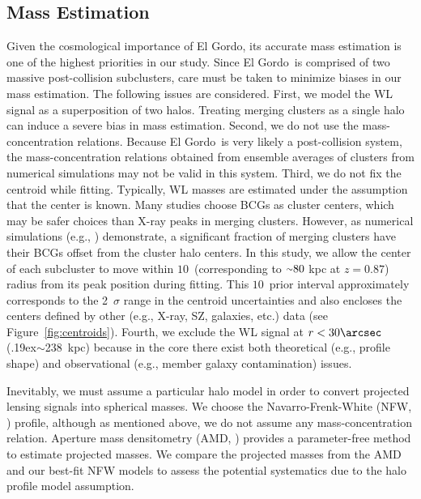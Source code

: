 \documentclass[twocolumn]{aastex631}
\newcommand{\elgordo}{El Gordo}
\newcommand{\mytilde}{\raise.19ex\hbox{$\scriptstyle\sim$}}
\begin{document}
\subsection{Mass Estimation} \label{mass_estimates}
Given the cosmological importance of \elgordo, its accurate mass estimation is one of the highest priorities in our study. 
Since \elgordo~is comprised of two massive post-collision subclusters, care must be taken to minimize biases in our mass estimation. The following issues are considered. 
First, we model the WL signal as a superposition of two halos. Treating merging clusters as a single halo can induce a severe bias in mass estimation. 
Second, we do not use the mass-concentration relations. Because \elgordo~is very likely a post-collision system, the mass-concentration relations obtained from ensemble averages of clusters from numerical simulations may not be valid in this system. 
Third, we do not fix the centroid while fitting. 
Typically, WL masses are estimated under the assumption that the center is known. Many studies choose BCGs as cluster centers, which may be safer choices than X-ray peaks in merging clusters. However, as numerical simulations (e.g., \citealt{Martel2014}) demonstrate, a significant fraction of merging clusters have their BCGs offset from the cluster halo centers. 
In this study, we allow the center of each subcluster to move within $10$\arcsec~(corresponding to $\mytilde80$ kpc at $z=0.87$) radius from its peak position during fitting. 
This $10$\arcsec~prior interval approximately corresponds
to the 2~$\sigma$ range in the centroid uncertainties and also encloses the centers defined by other (e.g., X-ray, SZ, galaxies, etc.) data (see Figure~\ref{fig:centroids}). 
Fourth, we exclude the WL signal at $r<30\arcsec$ (\mytilde238~kpc) because in the core there exist both theoretical (e.g., profile shape) and observational (e.g., member galaxy contamination) issues. 


Inevitably, we must assume a particular halo model in order to convert projected lensing signals into spherical masses. 
We choose the Navarro-Frenk-White (NFW, \citealt{NFW1997}) profile, although as mentioned above, we do not assume any mass-concentration relation. Aperture mass densitometry (AMD, \citealt{Fahlman1994}) provides a parameter-free method to estimate projected masses. 
We compare the projected masses from the AMD and our best-fit NFW models to assess the potential systematics due to the halo profile model assumption.
\end{document}
